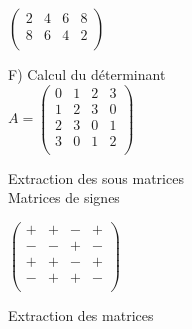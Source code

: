 $
\begin{pmatrix}
  2 & 4 & 6 & 8 \\
  8 & 6 & 4 & 2 \\
\end{pmatrix}
$

\vspace{10mm} %

F) Calcul du déterminant \\

$
A =
\begin{pmatrix}
  0 & 1 & 2 & 3 \\
  1 & 2 & 3 & 0 \\
  2 & 3 & 0 & 1 \\
  3 & 0 & 1 & 2 \\
\end{pmatrix}
$

\vspace{10mm} %

Extraction des sous matrices \\

\vspace{5mm} %
Matrices de signes \\

\vspace{5mm} %

$
\begin{pmatrix}
  + & + & - & + \\
  - & - & + & - \\
  + & + & - & + \\
  - & + & + & - \\
\end{pmatrix}
$

\vspace{10mm} %
Extraction des matrices \\
\vspace{5mm} %

